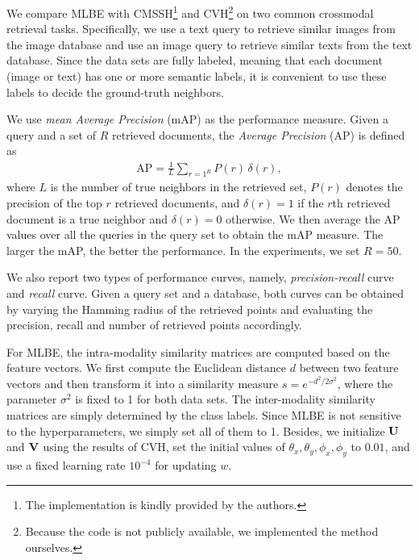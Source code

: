 We compare \mbox{MLBE} with \mbox{CMSSH}\footnote{The implementation is kindly provided by the authors.} and \mbox{CVH}\footnote{Because the code is not publicly available, we implemented the method ourselves.} on two common crossmodal retrieval tasks. Specifically, we use a text query to retrieve similar images from the image database and use an image query to retrieve similar texts from the text database. Since the data sets are fully labeled, meaning that each document (image or text) has one or more semantic labels, it is convenient to use these labels to decide the ground-truth neighbors. 

We use \textit{mean Average Precision} (\mbox{mAP}) as the performance measure. Given a query and a set of $R$ retrieved documents, the \textit{Average Precision} (\mbox{AP}) is defined as
\begin{align}
\mbox{AP} = \frac{1}{L}\sum\nolimits_{r=1}\nolimits^{R} P(r) \, \delta(r),\nonumber
\end{align}
where $L$ is the number of true neighbors in the retrieved set, $P(r)$ denotes the precision of the top $r$ retrieved documents, and $\delta(r)=1$ if the $r$th retrieved document is a true neighbor and $\delta(r)=0$ otherwise. We then average the \mbox{AP} values over all the queries in the query set to obtain the \mbox{mAP} measure. The larger the \mbox{mAP}, the better the performance. In the experiments, we set $R=50$.

We also report two types of performance curves, namely, \textit{precision-recall} curve and \textit{recall} curve. Given a query set and a database, both curves can be obtained by varying the Hamming radius of the retrieved points and evaluating the precision, recall and number of retrieved points accordingly.

For \mbox{MLBE}, the intra-modality similarity matrices are computed based on the feature vectors. We first compute the Euclidean distance $d$ between two feature vectors and then transform it into a similarity measure $s = e^{-d^2/2\sigma^2} $, where the parameter $\sigma^2$ is fixed to 1 for both data sets. The inter-modality similarity matrices are simply determined by the class labels. Since \mbox{MLBE} is not sensitive to the hyperparameters, we simply set all of them to 1. Besides, we initialize ${\bf U} $ and ${\bf V}$ using the results of \mbox{CVH}, set the initial values of $\theta_{x},\theta_{y},\phi_{x},\phi_{y}$ to $0.01$, and use a fixed learning rate $10^{-4}$ for updating $w$.

